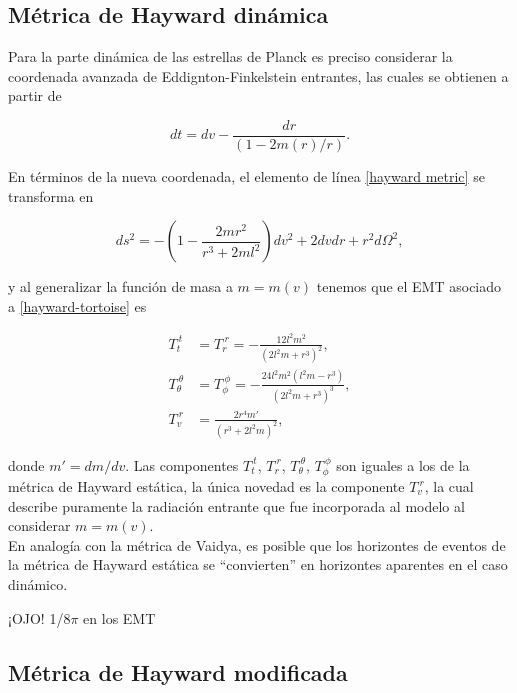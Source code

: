 \documentclass[16pt,a4paper]{article}
\numberwithin{equation}{section}
\theoremstyle{definition}
\begin{document}
\subsection{Métrica de Hayward dinámica}

Para la parte dinámica de las estrellas de Planck es preciso considerar la coordenada avanzada de Eddignton-Finkelstein entrantes, las cuales se obtienen a partir de

\begin{equation}
dt = dv - \frac{dr}{(1 - 2m(r)/r)}.
\end{equation}

En términos de la nueva coordenada, el elemento de línea \eqref{hayward metric} se transforma en 

\begin{equation}
\label{hayward-tortoise}
ds^2 = -\left( 1 - \frac{2mr^2}{r^3 + 2ml^2} \right) dv^2 + 2dvdr + r^2d\Omega ^2,
\end{equation}

y al generalizar la función de masa a $m = m(v)$ tenemos que el EMT asociado a \eqref{hayward-tortoise} es

\begin{equation}
\begin{aligned}
T_{t}^{\ t} &= T_{r}^{\ r} = -\frac{12 l^2 m^2}{\left(2 l^2 m+r^3\right)^2}, \\
T_{\theta}^{\ \theta} &= T_{\phi}^{\ \phi} = -\frac{24 l^2 m^2 \left(l^2 m-r^3\right)}{\left(2 l^2 m+r^3\right)^3},\\
T_{v}^{\ r} &= \frac{2r^4m'}{(r^3 + 2l^2m)^2},
\end{aligned}
\end{equation}

donde $m' = dm/dv$. Las componentes $T_{t}^{\ t}$, $T_{r}^{\ r}$, $T_{\theta}^{\ \theta}$, $T_{\phi}^{\ \phi}$ son iguales a los de la métrica de Hayward estática, la única novedad es la componente $T_{v}^{\ r}$, la cual describe puramente la radiación entrante que fue incorporada al modelo al considerar $m = m(v)$.\\

En analogía con la métrica de Vaidya, es posible que los horizontes de eventos de la métrica de Hayward estática se ``convierten'' en horizontes aparentes en el caso dinámico. 

¡OJO! 1/8$\pi$ en los EMT

\subsection{Métrica de Hayward modificada}
\end{document}
